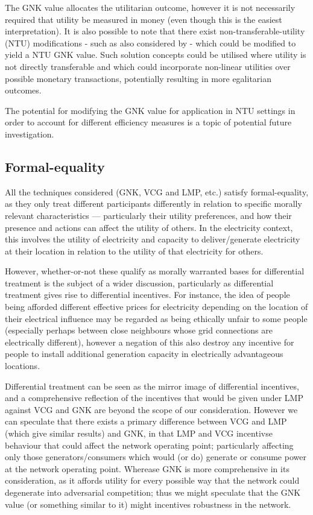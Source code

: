 The GNK value allocates the utilitarian outcome, however it is not necessarily required that utility be measured in money (even though this is the easiest interpretation).
It is also possible to note that there exist non-transferable-utility (NTU) modifications - such as also considered by \cite{value1} - which could be modified to yield a NTU GNK value.
Such solution concepts could be utilised where utility is not directly transferable and which could incorporate non-linear utilities over possible monetary transactions, potentially resulting in more egalitarian outcomes.

The potential for modifying the GNK value for application in NTU settings in order to account for different efficiency measures is a topic of potential future investigation.

\subsection{Formal-equality}

All the techniques considered (GNK, VCG and LMP, etc.) satisfy formal-equality, as they only treat different participants differently in relation to specific morally relevant characteristics --- particularly their utility preferences, and how their presence and actions can affect the utility of others.
In the electricity context, this involves the utility of electricity and capacity to deliver/generate electricity at their location in relation to the utility of that electricity for others.

However, whether-or-not these qualify as morally warranted bases for differential treatment is the subject of a wider discussion, particularly as differential treatment gives rise to differential incentives.
For instance, the idea of people being afforded different effective prices for electricity depending on the location of their electrical influence may be regarded as being ethically unfair to some people (especially perhaps between close neighbours whose grid connections are electrically different), however a negation of this also destroy any incentive for people to install additional generation capacity in electrically advantageous locations.

Differential treatment can be seen as the mirror image of differential incentives, and a comprehensive reflection of the incentives that would be given under LMP against VCG and GNK are beyond the scope of our consideration.
However we can speculate that there exists a primary difference between VCG and LMP (which give similar results) and GNK, in that LMP and VCG incentivse behaviour that could affect the network operating point; particularly affecting only those generators/consumers which would (or do) generate or consume power at the network operating point.
Wherease GNK is more comprehensive in its consideration, as it affords utility for every possible way that the network could degenerate into adversarial competition; thus we might speculate that the GNK value (or something similar to it) might incentives robustness in the network.

